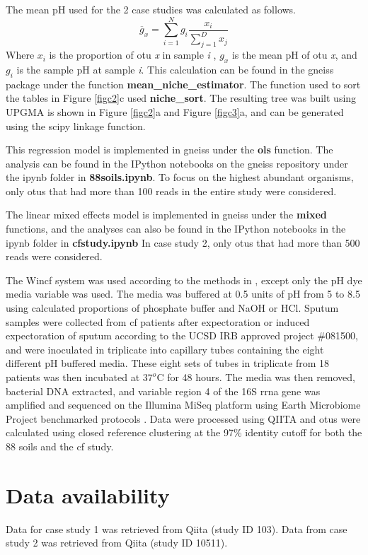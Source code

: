  The mean pH used for the 2 case studies was calculated as follows.
 \begin{equation}
        \overline{g}_{x}=\sum_{i=1}^{N}g_{i}\frac{x_{i}}{\sum_{j=1}^{D}x_{j}}
 \end{equation}
 Where $x_{i}$ is the proportion of \gls{otu} \textit{x} in sample \textit{i} , $g_{x}$ is the mean pH of \gls{otu} \textit{x}, and $g_{i}$ is the sample pH at sample \textit{i}. This calculation can be found in the gneiss package under the function \textbf{mean\_niche\_estimator}. The function used to sort the tables in Figure \ref{figc2}c used \textbf{niche\_sort}. The resulting tree was built using UPGMA \cite{upgma} is shown in Figure \ref{figc2}a and Figure \ref{figc3}a, and can be generated using the scipy linkage function.\par
 This regression model is implemented in gneiss under the \textbf{ols} function.  The analysis can be found in the IPython notebooks on the gneiss repository under the ipynb folder in \textbf{88soils.ipynb}. To focus on the highest abundant organisms, only \gls{otu}s that had more than 100 reads in the entire study were considered.\par
 The linear mixed effects model is implemented in gneiss under the \textbf{mixed} functions, and the analyses can also be found in the IPython notebooks in the ipynb folder in \textbf{cfstudy.ipynb} In case study 2, only \gls{otu}s that had more than 500 reads were considered.   \par
 The Win\gls{cf} system was used according to the methods in \cite{wincf}, except only the pH dye media variable was used. The media was buffered at 0.5 units of pH from 5 to 8.5 using calculated proportions of phosphate buffer and NaOH or HCl. Sputum samples were collected from \gls{cf} patients after expectoration or induced expectoration of sputum according to the UCSD IRB approved project \#081500, and were inoculated in triplicate into capillary tubes containing the eight different pH buffered media. These eight sets of tubes in triplicate from 18 patients was then incubated at $37^{o}$C for 48 hours. The media was then removed, bacterial DNA extracted, and variable region 4 of the 16S \gls{rrna} gene was amplified and sequenced on the Illumina MiSeq platform using Earth Microbiome Project benchmarked protocols \cite{dealing_with_zeros} \cite{global_patterns}.  Data were processed using QIITA and \gls{otu}s were calculated using closed reference clustering at the 97\% identity cutoff for both the 88 soils and the \gls{cf} study.
\section{ Data availability}
Data for case study 1 was retrieved from Qiita (study ID 103). Data from case study 2 was retrieved from Qiita (study ID 10511).
